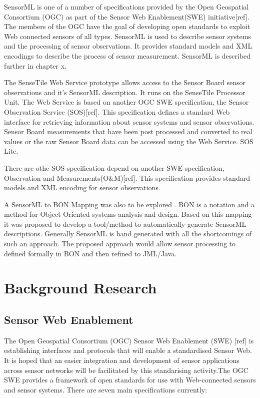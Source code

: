 \documentclass[]{final_report}
\begin{document}
SensorML is one of a number of specifications provided by the Open Geospatial Consortium (OGC) as part of the Sensor Web Enablement(SWE) initiative[ref]. The members of the OGC have the goal of developing open standards to exploit Web connected sensors of all types. SensorML is used to describe sensor systems and the processing of sensor observations. It provides standard models and XML encodings to describe the process of sensor measurement. SensorML is described further in chapter x.

The SenseTile Web Service prototype allows access to the Sensor Board sensor observations and it's SensorML description. It runs on the SenseTile Processor Unit.  The Web Service is based on another OGC SWE  specification, the Sensor Observation Service (SOS)[ref]. This specification defines a standard Web interface for retrieving information about sensor systems and sensor observations. Sensor Board measurements that have been post processed and converted to real values or the raw Sensor Board data can be accessed using the Web Service. SOS Lite.

There are othe  SOS specification depend on another SWE specification, Observation and Measurements(O\&M)[ref]. This specification provides standard models and XML encoding for sensor observations.

A  SensorML to BON Mapping was also to be explored . BON\cite{BONref} is a notation and a method for Object Oriented systems analysis and design. Based on this mapping it was proposed to develop a tool/method to automatically generate SensorML descriptions. Generally SensorML is hand generated with all the shortcomings of such an approach. The proposed approach would allow sensor processing to defined formally in BON and then refined to JML/Java. 


\chapter{ Background Research}


\section{Sensor Web Enablement}
The Open Geospatial Consortium (OGC) Sensor Web Enablement (SWE) [ref]  is establishing interfaces and protocols that will enable a standardised Sensor Web. It is hoped that an easier integration and development of sensor applications across sensor networks will be facilitated by this standarising activity.The OGC SWE provides a framework of open standards for use with Web-connected sensors and sensor systems. There are seven main specifications currently:
\end{document}
